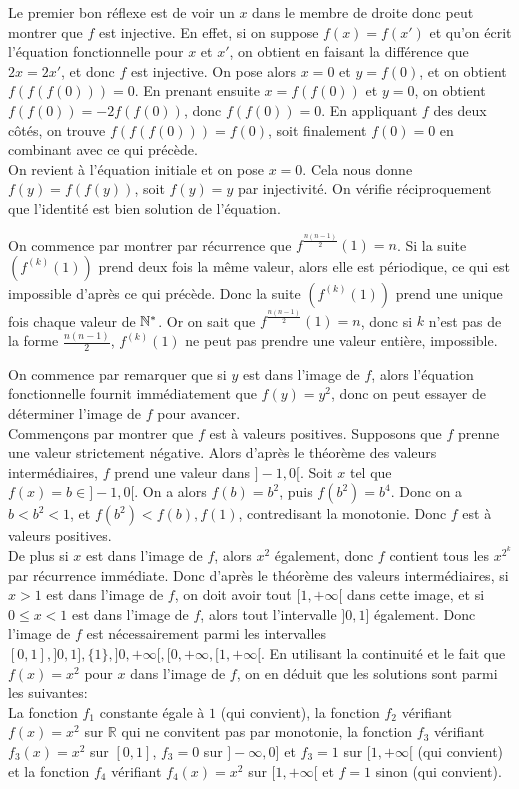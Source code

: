 \begin{sol}
Le premier bon réflexe est de voir un $x$ dans le membre de droite donc peut montrer que $f$ est injective. En effet, si on suppose $f(x)=f(x')$ et qu'on écrit l'équation fonctionnelle pour $x$ et $x'$, on obtient en faisant la différence que $2x=2x'$, et donc $f$ est injective. On pose alors $x=0$ et $y=f(0)$, et on obtient $f(f(f(0)))=0$. En prenant ensuite $x=f(f(0))$ et $y=0$, on obtient $f(f(0))=-2f(f(0))$, donc $f(f(0))=0$. En appliquant $f$ des deux côtés, on trouve $f(f(f(0)))=f(0)$, soit finalement $f(0)=0$ en combinant avec ce qui précède. \\
On revient à l'équation initiale et on pose $x=0$. Cela nous donne $f(y)=f(f(y))$, soit $f(y)=y$ par injectivité. On vérifie réciproquement que l'identité est bien solution de l'équation.
\end{sol}


\begin{sol}
On commence par montrer par récurrence que $f^{\frac{n(n-1)}{2}}(1)=n$. Si la suite $(f^{(k)}(1))$ prend deux fois la même valeur, alors elle est périodique, ce qui est impossible d'après ce qui précède. Donc la suite $(f^{(k)}(1))$ prend une unique fois chaque valeur de $\mathbb N^*$. Or on sait que $f^{\frac{n(n-1)}{2}}(1)=n$, donc si $k$ n'est pas de la forme $\displaystyle\frac{n(n-1)}{2}$, $f^{(k)}(1)$ ne peut pas prendre une valeur entière, impossible.
\end{sol}


\begin{sol}
On commence par remarquer que si $y$ est dans l'image de $f$, alors l'équation fonctionnelle fournit immédiatement que $f(y)=y^2$, donc on peut essayer de déterminer l'image de $f$ pour avancer. \\
Commençons par montrer que $f$ est à valeurs positives. Supposons que $f$ prenne une valeur strictement négative. Alors d'après le théorème des valeurs intermédiaires, $f$ prend une valeur dans $]-1,0[$. Soit $x$ tel que $f(x)=b\in ]-1,0[$. On a alors $f(b)=b^2$, puis $f(b^2)=b^4$. Donc on a $b<b^2<1$, et $f(b^2)<f(b),f(1)$, contredisant la monotonie. Donc $f$ est à valeurs positives. \\
De plus si $x$ est dans l'image de $f$, alors $x^2$ également, donc $f$ contient tous les $x^{2^k}$ par récurrence immédiate. Donc d'après le théorème des valeurs intermédiaires, si $x>1$ est dans l'image de $f$, on doit avoir tout $[1,+\infty[$ dans cette image, et si $0\le x<1$ est dans l'image de $f$, alors tout l'intervalle $]0,1]$ également. Donc l'image de $f$ est nécessairement parmi les intervalles $[0,1],]0,1],\{1\},]0,+\infty[,[0,+\infty, [1,+\infty[$. En utilisant la continuité et le fait que $f(x)=x^2$ pour $x$ dans l'image de $f$, on en déduit que les solutions sont parmi les suivantes:\\
La fonction $f_1$ constante égale à $1$ (qui convient), la fonction $f_2$ vérifiant $f(x)=x^2$ sur $\mathbb{R}$ qui ne convitent pas par monotonie, la fonction $f_3$ vérifiant $f_3(x)=x^2$ sur $[0,1]$, $f_3=0$ sur $]-\infty,0]$ et $f_3=1$ sur $[1,+\infty[$ (qui convient) et la fonction $f_4$ vérifiant $f_4(x)=x^2$ sur $[1,+\infty[$ et $f=1$ sinon (qui convient).
\end{sol}


